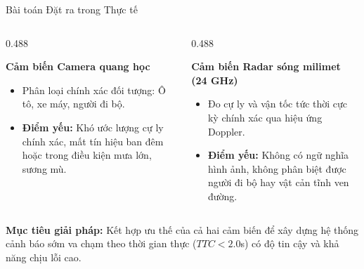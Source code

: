 \documentclass[aspectratio=169, 11pt]{beamer}
\begin{document}
\begin{frame}{Bài toán Đặt ra trong Thực tế}
  \vspace{0.15cm}
  \raggedright
  \par
  \vspace{0.05cm}
  \begin{columns}[T, onlytextwidth]
    \begin{column}{0.488\textwidth}
      \begin{tcolorbox}[
        enhanced, colback=white, colframe=DarkMain, boxrule=0.9pt, arc=3.2pt,
        top=3.5pt, bottom=3.5pt, left=6pt, right=6pt
      ]
        {\fontsize{8.0pt}{9.5pt}\selectfont\bfseries\color{DarkMain} Cảm biến Camera quang học}\\[2pt]
        {\fontsize{7.2pt}{9.0pt}\selectfont
        \begin{itemize}
          \item Phân loại chính xác đối tượng: Ô tô, xe máy, người đi bộ.
          \item \textbf{Điểm yếu:} Khó ước lượng cự ly chính xác, mất tín hiệu ban đêm hoặc trong điều kiện mưa lớn, sương mù.
        \end{itemize}}
      \end{tcolorbox}
    \end{column}
    \begin{column}{0.488\textwidth}
      \begin{tcolorbox}[
        enhanced, colback=white, colframe=DarkMain, boxrule=0.9pt, arc=3.2pt,
        top=3.5pt, bottom=3.5pt, left=6pt, right=6pt
      ]
        {\fontsize{8.0pt}{9.5pt}\selectfont\bfseries\color{DarkMain} Cảm biến Radar sóng milimet (24 GHz)}\\[2pt]
        {\fontsize{7.2pt}{9.0pt}\selectfont
        \begin{itemize}
          \item Đo cự ly và vận tốc tức thời cực kỳ chính xác qua hiệu ứng Doppler.
          \item \textbf{Điểm yếu:} Không có ngữ nghĩa hình ảnh, không phân biệt được người đi bộ hay vật cản tĩnh ven đường.
        \end{itemize}}
      \end{tcolorbox}
    \end{column}
  \end{columns}

  \vspace{0.10cm}
  \begin{tcolorbox}[
    enhanced, colback=DarkMain, colframe=white, boxrule=1.0pt, arc=3.5pt,
    top=3.5pt, bottom=3.5pt, left=8pt, right=8pt
  ]
    {\fontsize{7.4pt}{9.2pt}\selectfont\color{white}\textbf{Mục tiêu giải pháp:} Kết hợp ưu thế của cả hai cảm biến để xây dựng hệ thống cảnh báo sớm va chạm theo thời gian thực ($TTC < 2.0$s) có độ tin cậy và khả năng chịu lỗi cao.}
  \end{tcolorbox}
\end{frame}
\end{document}
